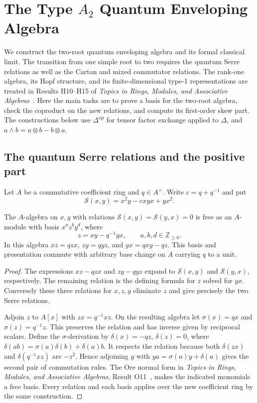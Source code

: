 \chapter[The Type A2 Quantum Enveloping Algebra]{The Type \(A_2\) Quantum Enveloping Algebra}
\label{ch:quantum-enveloping}

We construct the two-root quantum enveloping algebra and its formal
classical limit. The transition from one simple root to two requires
the quantum Serre relations as well as the Cartan and mixed
commutator relations. The rank-one algebra, its Hopf structure,
and its finite-dimensional type-1 representations are treated
in Results H10--H15 of \emph{Topics in Rings, Modules, and
Associative Algebras}~\cite[PDF pp.~25--28]{mg-rm03d}.
Here the main tasks are to prove a basis for the two-root algebra,
check the coproduct on the new relations, and compute its
first-order skew part. The constructions below use
\(\Delta^{\mathrm{op}}\) for tensor factor exchange applied to
\(\Delta\), and \(a\wedge b=a\otimes b-b\otimes a\).

\section{The quantum Serre relations and the positive part}

Let \(A\) be a commutative coefficient ring and \(q\in A^\times\).
Write \(c=q+q^{-1}\) and put
\[
 \mathcal S(x,y)=x^2y-cxyx+yx^2 .
\]

\begin{theorem}
\label{res:UQ01}
The \(A\)-algebra on \(x,y\) with relations
\(\mathcal S(x,y)=\mathcal S(y,x)=0\) is free as an
\(A\)-module with basis \(x^a z^b y^d\), where
\[
 z=xy-q^{-1}yx,\qquad a,b,d\in\mathbb Z_{\ge0}.
\]
In this algebra \(xz=qzx\), \(zy=qyz\), and \(yx=qxy-qz\).
This basis and presentation commute with arbitrary base change
on \(A\) carrying \(q\) to a unit.
\end{theorem}
\begin{proof}
The expressions \(xz-qzx\) and \(zy-qyz\) expand to
\(\mathcal S(x,y)\) and \(\mathcal S(y,x)\), respectively.
The remaining relation is the defining formula for \(z\)
solved for \(yx\). Conversely these three relations for
\(x,z,y\) eliminate \(z\) and give precisely the two Serre
relations.

Adjoin \(z\) to \(A[x]\) with \(zx=q^{-1}xz\).
On the resulting algebra let \(\sigma(x)=qx\) and
\(\sigma(z)=q^{-1}z\). This preserves the relation and
has inverse given by reciprocal scalars. Define the
\(\sigma\)-derivation by \(\delta(x)=-qz\), \(\delta(z)=0\),
where \(\delta(ab)=\sigma(a)\delta(b)+\delta(a)b\).
It respects the relation because both \(\delta(zx)\) and
\(\delta(q^{-1}xz)\) are \(-z^2\). Hence adjoining \(y\)
with \(ya=\sigma(a)y+\delta(a)\) gives the second pair
of commutation rules. The Ore normal form in
\emph{Topics in Rings, Modules, and Associative Algebras},
Result O11~\cite[PDF p.~34]{mg-rm03d}, makes the indicated
monomials a free basis. Every relation and each basis
applies over the new coefficient ring by the same construction.
\end{proof}

